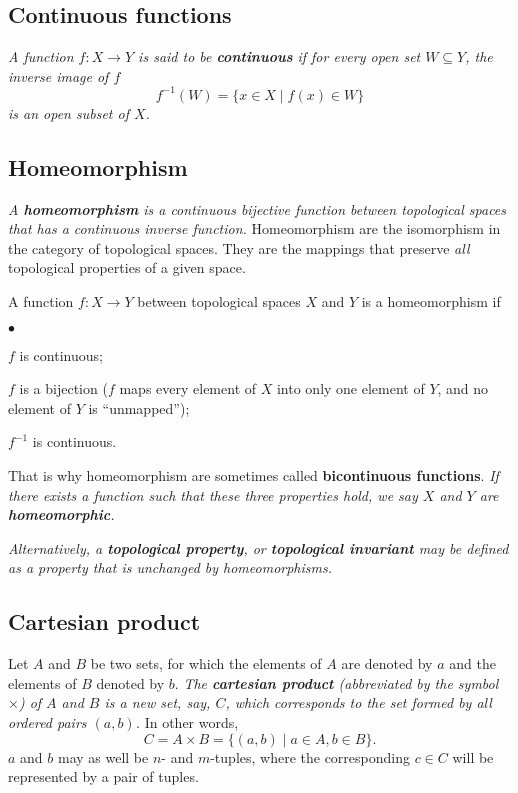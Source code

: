 \documentclass{book}
\newcommand{\cartprod}{\times}
\newcommand{\suchthat}{\mid}
\begin{document}
\subsection{Continuous functions}
\textit{A function $f: X \to Y$ is said to be \textbf{continuous} if for every open set $W \subseteq Y$, the inverse image of $f$
\begin{equation}
 f^{-1}(W) = \{x \in X \suchthat f(x) \in W\}
\end{equation}
is an open subset of $X$.}
% 
\subsection{Homeomorphism}
\textit{A \textbf{homeomorphism} is a continuous bijective function between topological spaces that has a continuous inverse function.}
Homeomorphism are the isomorphism in the category of topological spaces. They are the mappings that preserve \textit{all} topological properties of a given space.

A function $f: X \to Y$ between topological spaces $X$ and $Y$ is a homeomorphism if
\begin{list}{$\bullet$}{}
 \item $f$ is continuous;
 \item $f$ is a bijection ($f$ maps every element of $X$ into only one element of $Y$, and no element of $Y$ is ``unmapped'');
 \item $f^{-1}$ is continuous.
\end{list}

That is why homeomorphism are sometimes called \textbf{bicontinuous functions}. \textit{If there exists a function such that these three properties hold,
we say $X$ and $Y$ are \textbf{homeomorphic}.}

\textit{Alternatively, a \textbf{topological property}, or \textbf{topological invariant} may be defined as a property that is unchanged by homeomorphisms.}
% 
\subsection{Cartesian product}
Let $A$ and $B$ be two sets, for which the elements of $A$ are denoted by $a$ and the elements of $B$ denoted by $b$. \textit{The \textbf{cartesian product}
(abbreviated by the symbol $\cartprod$) of $A$ and $B$ is a new set, say, $C$, which corresponds to the set formed by all ordered pairs $(a,b)$.} In other words,
\begin{equation}
 C = A \cartprod B = \{(a,b) \suchthat a \in A, b \in B\}.
\end{equation}
$a$ and $b$ may as well be $n$- and $m$-tuples, where the corresponding $c \in C$ will be represented by a pair of tuples.
\end{document}

